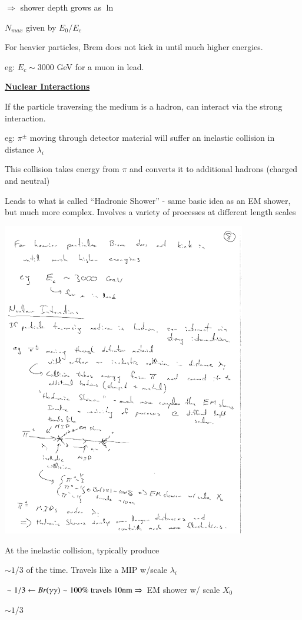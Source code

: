{$\Rightarrow$ shower depth grows as $\ln$

$N_{max}$ given by $E_0/E_c$

\clearpage

For heavier particles, Brem does not kick in until much higher energies.

eg: $E_c \sim 3000$ GeV for a muon in lead.

\lineacross

\underline{\textbf{Nuclear Interactions} }

If the particle traversing the medium is a hadron, can interact via the strong interaction.

eg: $\pi^\pm$ moving through detector material will suffer an inelastic collision in distance $\lambda_i$

This collision takes energy from $\pi$ and converts it to additional hadrons (charged and neutral)

Leads to what is called ``Hadronic Shower'' - same basic idea as an EM shower, but much more complex.
Involves a variety of processes at different length scales

\bc
\includegraphics[width=0.8\textwidth]{./HadronicShower.pdf}
\ec

At the inelastic collision, typically produce 
\bi
\item[$\pi^+$] $\sim 1/3$ of the time. Travels like a MIP w/scale $\lambda_i$
\item[$\pi^0$] $\sim 1/3 \leftarrow Br(\gamma\gamma) \sim 100\%\ \textrm{travels 10nm} \Rightarrow $ EM shower w/ scale $X_0$
\item[$\pi^-$] $\sim 1/3$ 
\ei

}
